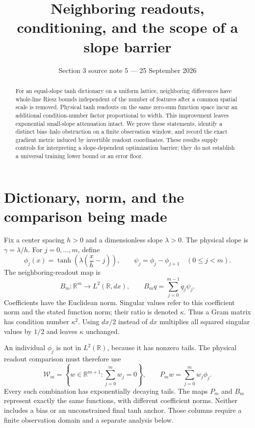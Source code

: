 \documentclass[11pt]{article}
\title{Neighboring readouts, conditioning, and the scope of a slope barrier}
\author{}
\date{Section 3 source note 5 --- 25 September 2026}
\theoremstyle{remark}
\newcommand{\R}{\mathbb R}
\begin{document}
\maketitle

\begin{abstract}
For an equal-slope tanh dictionary on a uniform lattice, neighboring
differences have whole-line Riesz bounds independent of the number of
features after a common spatial scale is removed.  Physical tanh
readouts on the same zero-sum function space incur an additional
condition-number factor proportional to width.  This improvement leaves
exponential small-slope attenuation intact.  We prove these statements,
identify a distinct bias--halo obstruction on a finite observation
window, and record the exact gradient metric induced by invertible
readout coordinates.  These results supply controls for interpreting a
slope-dependent optimization barrier; they do not establish a universal
training lower bound or an error floor.
\end{abstract}

\section{Dictionary, norm, and the comparison being made}

Fix a center spacing $h>0$ and a dimensionless slope $\lambda>0$.
The physical slope is $\gamma=\lambda/h$.  For $j=0,\ldots,m$, define
\[
 \phi_j(x)=\tanh\!\left(\lambda\left(\frac{x}{h}-j\right)\right),
 \qquad \psi_j=\phi_j-\phi_{j+1}\quad(0\le j<m).
\]
The neighboring-readout map is
\[
 B_m:\R^m\longrightarrow L^2(\R,dx),
 \qquad B_mq=\sum_{j=0}^{m-1}q_j\psi_j.
\]
Coefficients have the Euclidean norm.  Singular values refer to this
coefficient norm and the stated function norm; their ratio is denoted
$\kappa$.  Thus a Gram matrix has condition number $\kappa^2$.
Using $dx/2$ instead of $dx$ multiplies all squared singular values by
$1/2$ and leaves $\kappa$ unchanged.

An individual $\phi_j$ is not in $L^2(\R)$, because it has nonzero tails.
The physical readout comparison must therefore use
\[
 \mathcal W_m=\left\{w\in\R^{m+1}:\sum_{j=0}^m w_j=0\right\},
 \qquad P_mw=\sum_{j=0}^{m}w_j\phi_j.
\]
Every such combination has exponentially decaying tails.  The maps
$P_m$ and $B_m$ represent exactly the same functions, with different
coefficient norms.  Neither includes a bias or an unconstrained final
tanh anchor.  Those columns require a finite observation domain and a
separate analysis below.
\end{document}
